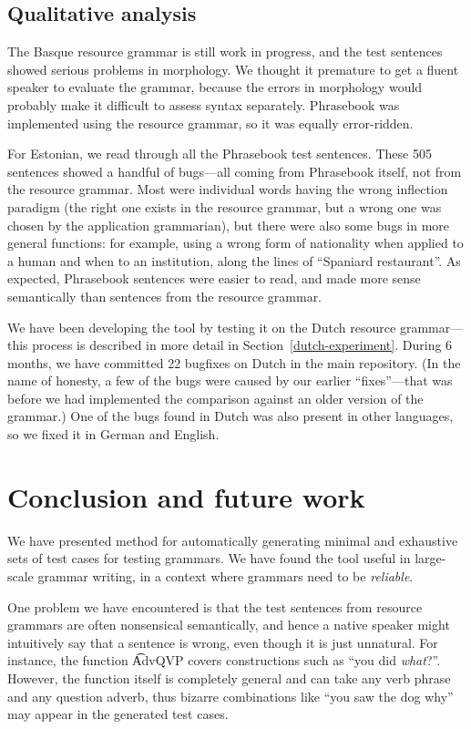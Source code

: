 \subsection{Qualitative analysis} 

The Basque resource grammar is still work in progress, and the test
sentences showed serious problems in morphology. We thought it
premature to get a fluent speaker to evaluate the grammar, because the
errors in morphology would probably make it difficult to assess syntax
separately. Phrasebook was implemented using the resource grammar, so
it was equally error-ridden.

For Estonian, we read through all the Phrasebook test sentences. These
505 sentences showed a handful of bugs---all coming from Phrasebook
itself, not from the resource grammar. Most were individual words
having the wrong inflection paradigm (the right one exists in the
resource grammar, but a wrong one was chosen by the application
grammarian), but there were also some bugs in more general
functions: for example, using a wrong form of nationality when applied
to a human and when to an institution, along the lines of ``Spaniard
restaurant''. As expected, Phrasebook sentences were easier to read,
and made more sense semantically than sentences from the resource
grammar.

We have been developing the tool by testing it on the Dutch resource
grammar---this process is described in more detail in
Section~\ref{dutch-experiment}. During 6 months, we have committed 22
bugfixes on Dutch in the \gf{} main repository. (In the name of
honesty, a few of the bugs were caused by our earlier “fixes”—that was
before we had implemented the comparison against an older version of
the grammar.) One of the bugs found in Dutch was also present in other
languages, so we fixed it in German and English.



\section{Conclusion and future work}
\label{gf-future}

We have presented method for automatically generating minimal and
exhaustive sets of test cases for testing grammars.  We have found the
tool useful in large-scale grammar writing, in a context where
grammars need to be \emph{reliable}.

One problem we have encountered is that the test sentences from
resource grammars are often nonsensical semantically, and hence a
native speaker might intuitively say that a sentence is wrong, even
though it is just unnatural.  For instance, the function \t{AdvQVP}
covers constructions such as ``you did \emph{what}?''. However, the
function itself is completely general and can take any verb phrase and
any question adverb, thus bizarre combinations like ``you saw the dog
why''  may appear in the generated test cases. 

